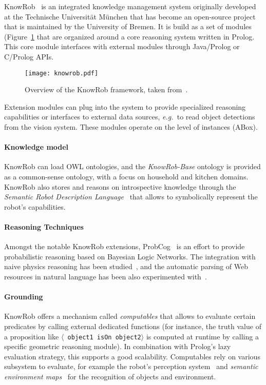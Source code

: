 \documentclass[journal]{IEEEtran}
\newcommand{\eg}{{\textit{e.g.\ }}}
\newcommand{\stmt}[1]{{\footnotesize \tt $\langle$ #1\relax$\rangle$}}
\begin{document}
{\sc KnowRob}~\cite{Tenorth2009a,tenorth13knowrob} is an integrated knowledge 
management system originally developed at the Technische Universität München 
that has become an open-source project that is maintained by the University
of Bremen. It is build as a set of modules (Figure~\ref{fig|knowrob} that are 
organized around a core reasoning system written in Prolog. This core module 
interfaces with external modules through Java/Prolog or C/Prolog APIs.

\begin{figure}
    \centering
    \texttt{[image: knowrob.pdf]}

    \caption{Overview of the {\sc KnowRob} framework, taken
    from~\cite{Tenorth2011}.}

    \label{fig|knowrob}
\end{figure}

Extension modules can plug into the system to provide specialized reasoning
capabilities or interfaces to external data sources, \eg to read object
detections from the vision system. These modules operate on the level of
instances (ABox).

\paragraph{Knowledge model} {\sc KnowRob} can load OWL ontologies, and the
\emph{KnowRob-Base} ontology is provided as a common-sense ontology, with a
focus on household and kitchen domains. {\sc KnowRob} also stores and reasons 
on introspective knowledge through the \emph{Semantic Robot Description
Language}~\cite{Kunze2011} that allows to symbolically represent the robot's
capabilities.

\paragraph{Reasoning Techniques} Amongst the notable {\sc KnowRob} extensions,
{\sc ProbCog}~\cite{Jain2009} is an effort to provide probabilistic reasoning
based on Bayesian Logic Networks. The integration with naive physics reasoning 
has been studied~\cite{Kunze2011a}, and the automatic parsing of Web resources 
in natural language has been also experimented with~\cite{tenorth10webinstructions}.

\paragraph{Grounding} {\sc KnowRob} offers a mechanism called \emph{computables} 
that allows to evaluate certain predicates by calling external dedicated functions 
(for instance, the truth value of a proposition like \stmt{object1 isOn object2} 
is computed at runtime by calling a specific geometric reasoning module). In
combination with Prolog's lazy evaluation strategy, this supports a good
scalability.
Computables rely on various subsystem to evaluate, for example the robot's 
perception system~\cite{Klank2009} and \emph{semantic environment maps}~\cite{Blodow2011}
for the recognition of objects and environment.
\end{document}
